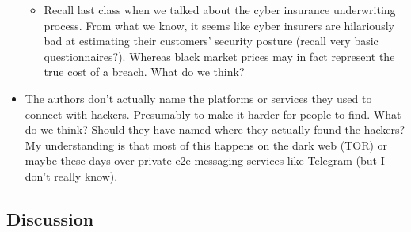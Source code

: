 \documentclass[11pt]{article}
\begin{document}
\begin{itemize}
\begin{itemize}
            \item Recall last class when we talked about the cyber insurance underwriting process. From what we know, it seems like cyber insurers are hilariously bad at estimating their customers' security posture (recall very basic questionnaires?). Whereas black market prices may in fact represent the true cost of a breach. What do we think?
        \end{itemize}
        \item The authors don't actually name the platforms or services they used to connect with hackers. Presumably to make it harder for people to find. What do we think? Should they have named where they actually found the hackers? My understanding is that most of this happens on the dark web (TOR) or maybe these days over private e2e messaging services like Telegram (but I don't really know).
    \end{itemize}


\subsection{Discussion}
\end{document}
